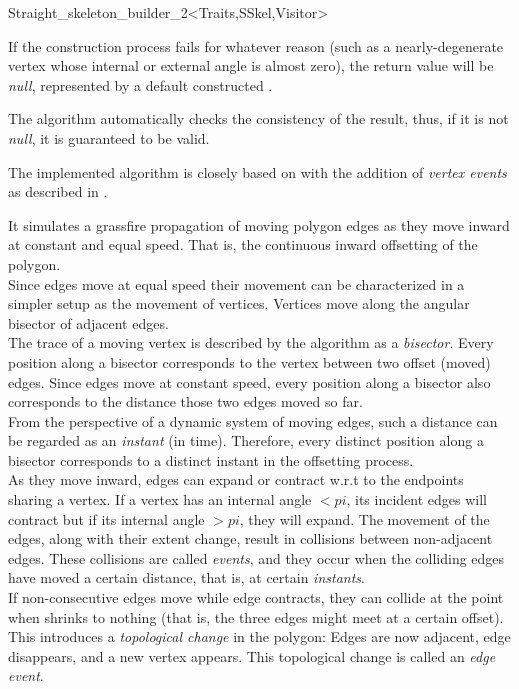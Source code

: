 \begin{ccRefClass}{Straight_skeleton_builder_2<Traits,SSkel,Visitor>}
{If the construction process fails for whatever reason (such as a nearly-degenerate vertex whose internal or external angle is almost zero), the return value will be {\em null}, represented by a default constructed .

The algorithm automatically checks the consistency of the result, thus, if it is not {\em null}, it is guaranteed to be valid.
}




The implemented algorithm is closely based on \cite{cgal:fo-ss-98} with the addition of \textit{vertex events} as described in \cite{cgal:ee-rrccpp-98}.

It simulates  a grassfire propagation of moving polygon edges as they move inward at constant
and equal speed. That is, the continuous inward offsetting of the polygon.\\
Since edges move at equal speed their movement can be characterized in a simpler setup as the movement of vertices. Vertices move along the angular bisector of adjacent edges.\\
The trace of a moving vertex is described by the algorithm as a {\em bisector}. 
Every position along a bisector corresponds to the vertex between two offset (moved) edges. Since edges move at constant speed, every position along a bisector also corresponds to the distance those two edges moved so far.\\
From the perspective of a dynamic system of moving edges, such a distance can be regarded as an 
{\em instant} (in time). Therefore, every distinct position along a bisector corresponds to a distinct instant in the offsetting process.\\
As they move inward, edges can expand or contract w.r.t to the endpoints sharing a vertex. If a vertex has an internal angle $<pi$, its incident edges will contract but if its internal angle $>pi$, they will expand. The movement of the edges, along with their extent change, result in collisions between non-adjacent edges. These collisions are called {\em events}, and they occur when the colliding edges have moved a certain distance, that is, at certain \textit{instants}.\\
If non-consecutive edges  move while edge  contracts, they can collide at the point when  shrinks to nothing (that is, the three edges might meet at a certain offset). This introduces a \textit{topological change} in the polygon: Edges  are now adjacent, edge  disappears, and a new vertex appears. This topological change is called an {\em edge event}.\\

\end{ccRefClass}
